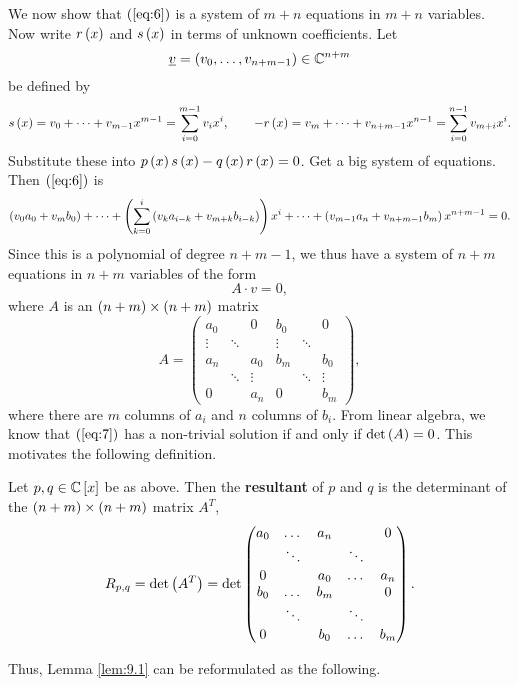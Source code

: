 We now show that $ \left( \ref{eq:6} \right) $ is a system of $ m + n $ equations in $ m + n $ variables. Now write $ r\left( x \right) $ and $ s\left( x \right) $ in terms of unknown coefficients. Let
$$ \underline{v} = \left( v_0, \dots, v_{n + m - 1} \right) \in \mathbb{C}^{n + m} $$
be defined by
$$ s\left( x \right) = v_0 + \dots + v_{m - 1}x^{m - 1} = \sum_{i = 0}^{m - 1} v_ix^i, \qquad -r\left( x \right) = v_m + \dots + v_{n + m - 1}x^{n - 1} = \sum_{i = 0}^{n - 1} v_{m + i}x^i. $$
Substitute these into $ p\left( x \right)s\left( x \right) - q\left( x \right)r\left( x \right) = 0 $. Get a big system of equations. Then $ \left( \ref{eq:6} \right) $ is
$$ \left( v_0a_0 + v_mb_0 \right) + \dots + \left( \sum_{k = 0}^i \left( v_ka_{i - k} + v_{m + k}b_{i - k} \right) \right)x^i + \dots + \left( v_{m - 1}a_n + v_{n + m - 1}b_m \right)x^{n + m - 1} = 0. $$
Since this is a polynomial of degree $ n + m - 1 $, we thus have a system of $ n + m $ equations in $ n + m $ variables of the form
\begin{equation}
\label{eq:7}
A \cdot v = 0,
\end{equation}
where $ A $ is an $ \left( n + m \right) \times \left( n + m \right) $ matrix
$$ A =
\begin{pmatrix}
a_0 & & 0 & b_0 & & 0 \\
\vdots & \ddots & & \vdots & \ddots & \\
a_n & & a_0 & b_m & & b_0 \\
& \ddots & \vdots & & \ddots & \vdots \\
0 & & a_n & 0 & & b_m
\end{pmatrix},
$$
where there are $ m $ columns of $ a_i $ and $ n $ columns of $ b_i $. From linear algebra, we know that $ \left( \ref{eq:7} \right) $ has a non-trivial solution if and only if $ \det\left( A \right) = 0 $. This motivates the following definition.

\begin{definition}
Let $ p, q \in \mathbb{C}\left[ x \right] $ be as above. Then the \textbf{resultant} of $ p $ and $ q $ is the determinant of the $ \left( n + m \right) \times \left( n + m \right) $ matrix $ A^T $,
$$ R_{p, q} = \det\left( A^T \right) = \det
\begin{pmatrix}
a_0 & \dots & a_n & & 0 \\
& \ddots & & \ddots & \\
0 & & a_0 & \dots & a_n \\
b_0 & \dots & b_m & & 0 \\
& \ddots & & \ddots & \\
0 & & b_0 & \dots & b_m
\end{pmatrix}.
$$
\end{definition}

Thus, Lemma \ref{lem:9.1} can be reformulated as the following.

